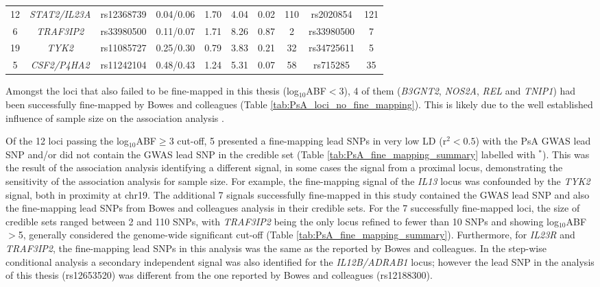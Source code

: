 \begin{landscape}
\begin{center}
\begin{longtable}[htbp]{c c c c c c c c c c}
12 &\textit{STAT2/IL23A}	 &rs12368739	          &0.04/0.06	&1.70	&4.04	&0.02	&110 &	rs2020854	&121 \\
6	 & \textit{TRAF3IP2}	   &rs33980500	          &0.11/0.07	&1.71	&8.26	&0.87	&2	&rs33980500	&7 \\
19 &	\textit{TYK2}	       &rs11085727	          &0.25/0.30	&0.79	&3.83	&0.21	&32	&rs34725611	&5 \\
5	 & \textit{CSF2/P4HA2}	 &rs11242104            &0.48/0.43 &1.24 &5.31 &0.07 &58	&rs715285 &35 \\
\bottomrule
\end{longtable}
\end{center}
\end{landscape}


Amongst the loci that also failed to be fine-mapped in this thesis (log$_{10}$ABF$<$3), 4 of them (\textit{B3GNT2}, \textit{NOS2A}, \textit{REL} and \textit{TNIP1}) had been successfully fine-mapped by Bowes and colleagues (Table \ref{tab:PsA_loci_no_fine_mapping}). This is likely due to the well established influence of sample size on the association analysis \parencite{Bunt2015}. %


Of the 12 loci passing the log$_{10}$ABF$\geq$3 cut-off, 5 presented a fine-mapping lead SNPs in very low LD (r${^2}<0.5$) with the PsA GWAS lead SNP and/or did not contain the GWAS lead SNP in the credible set (Table \ref{tab:PsA_fine_mapping_summary} labelled with $^{\ast}$). This was the result of the association analysis identifying a different signal, in some cases the signal from a proximal locus, demonstrating the sensitivity of the association analysis for sample size. For example, the fine-mapping signal of the \textit{IL13} locus was confounded by the \textit{TYK2} signal, both in proximity at chr19. The additional 7 signals successfully fine-mapped in this study contained the GWAS lead SNP and also the fine-mapping lead SNPs from Bowes and colleagues analysis in their credible sets. For the 7 successfully fine-mapped loci, the size of credible sets ranged between 2 and 110 SNPs, with \textit{TRAF3IP2} being the only locus refined to fewer than 10 SNPs and showing log$_{10}$ABF$>$5, generally considered the genome-wide significant cut-off (Table \ref{tab:PsA_fine_mapping_summary}). Furthermore, for \textit{IL23R} and \textit{TRAF3IP2}, the fine-mapping lead SNPs in this analysis was the same as the reported by Bowes and colleagues. In the step-wise conditional analysis a secondary independent signal was also identified for the \textit{IL12B/ADRAB1} locus; however the lead SNP in the analysis of this thesis (rs12653520) was different from the one reported by Bowes and colleagues (rs12188300). 




